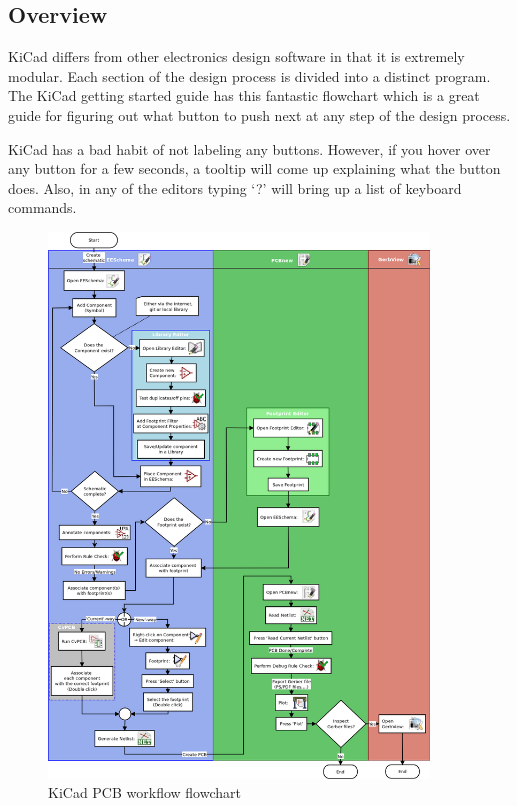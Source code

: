 \documentclass[12pt, oneside]{article}
\begin{document}
\subsection{Overview}
KiCad differs from other electronics design software in that it is extremely modular. Each section of the design process is divided into a distinct program. The KiCad getting started guide has this fantastic flowchart which is a great guide for figuring out what button to push next at any step of the design process.

KiCad has a bad habit of not labeling any buttons. However, if you hover over any button for a few seconds, a tooltip will come up explaining what the button does. Also, in any of the editors typing `?' will bring up a list of keyboard commands.

\begin{figure}[H]
\includegraphics[width=0.9\textwidth]{kicad_flowchart}
\centering
\caption{KiCad PCB workflow flowchart}
\end{figure}
\end{document}
